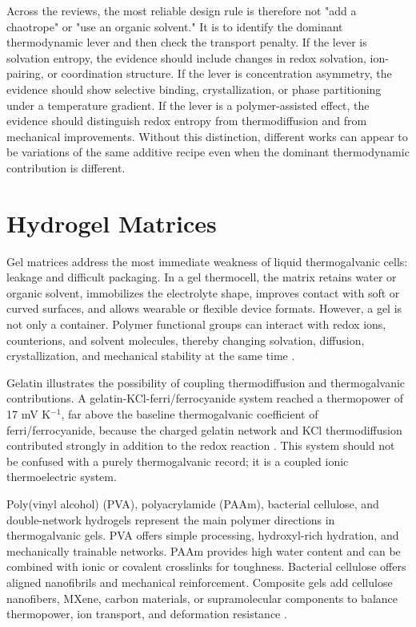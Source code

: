 Across the reviews, the most reliable design rule is therefore not "add a
chaotrope" or "use an organic solvent." It is to identify the dominant
thermodynamic lever and then check the transport penalty. If the lever is
solvation entropy, the evidence should include changes in redox solvation,
ion-pairing, or coordination structure. If the lever is concentration
asymmetry, the evidence should show selective binding, crystallization, or
phase partitioning under a temperature gradient. If the lever is a
polymer-assisted effect, the evidence should distinguish redox entropy from
thermodiffusion and from mechanical improvements. Without this distinction,
different works can appear to be variations of the same additive recipe even
when the dominant thermodynamic contribution is different.

\section{Hydrogel Matrices}

Gel matrices address the most immediate weakness of liquid thermogalvanic
cells: leakage and difficult packaging. In a gel thermocell, the matrix retains
water or organic solvent, immobilizes the electrolyte shape, improves contact
with soft or curved surfaces, and allows wearable or flexible device formats.
However, a gel is not only a container. Polymer functional groups can interact
with redox ions, counterions, and solvent molecules, thereby changing
solvation, diffusion, crystallization, and mechanical stability at the same
time \citep{lin2024triple,lu2024zwitterion,yin2023bacterial}.

Gelatin illustrates the possibility of coupling thermodiffusion and
thermogalvanic contributions. A gelatin-KCl-ferri/ferrocyanide system reached
a thermopower of 17 mV K$^{-1}$, far above the baseline thermogalvanic
coefficient of ferri/ferrocyanide, because the charged gelatin network and KCl
thermodiffusion contributed strongly in addition to the redox reaction
\citep{han2020gelatin}. This system should not be confused
with a purely thermogalvanic record; it is a coupled ionic thermoelectric
system.

Poly(vinyl alcohol) (PVA), polyacrylamide (PAAm), bacterial cellulose, and
double-network hydrogels represent the main polymer directions in
thermogalvanic gels. PVA offers simple processing, hydroxyl-rich hydration, and
mechanically trainable networks. PAAm provides high water content and can be
combined with ionic or covalent crosslinks for toughness. Bacterial cellulose
offers aligned nanofibrils and mechanical reinforcement. Composite gels add
cellulose nanofibers, MXene, carbon materials, or supramolecular components to
balance thermopower, ion transport, and deformation resistance
\citep{zhou2020hydrogel,yang2023strong,liu2024armor,lin2024triple}.

